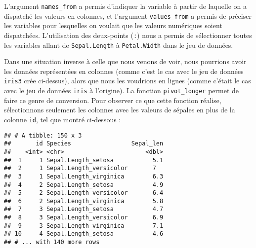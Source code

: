 \documentclass[
  french,
]{book}
\newenvironment{Shaded}{\begin{snugshade}}{\end{snugshade}}
\newcommand{\DataTypeTok}[1]{\textcolor[rgb]{0.13,0.29,0.53}{#1}}
\newcommand{\KeywordTok}[1]{\textcolor[rgb]{0.13,0.29,0.53}{\textbf{#1}}}
\newcommand{\NormalTok}[1]{#1}
\newcommand{\OperatorTok}[1]{\textcolor[rgb]{0.81,0.36,0.00}{\textbf{#1}}}
\newcommand{\StringTok}[1]{\textcolor[rgb]{0.31,0.60,0.02}{#1}}
\begin{document}
L'argument \texttt{names\_from} a permis d'indiquer la variable à partir de laquelle on a dispatché les valeurs en colonnes, et l'argument \texttt{values\_from} a permis de préciser les variables pour lesquelles on voulait que les valeurs numériques soient dispatchées. L'utilisation des deux-points (\texttt{:}) nous a permis de sélectionner toutes les variables allant de \texttt{Sepal.Length} à \texttt{Petal.Width} dans le jeu de données.

Dans une situation inverse à celle que nous venons de voir, nous pourrions avoir les données représentées en colonnes (comme c'est le cas avec le jeu de données \texttt{iris3} crée ci-dessus), alors que nous les voudrions en lignes (comme c'était le cas avec le jeu de données \texttt{iris} à l'origine). La fonction \texttt{pivot\_longer} permet de faire ce genre de conversion. Pour observer ce que cette fonction réalise, sélectionnons seulement les colonnes avec les valeurs de sépales en plus de la colonne \texttt{id}, tel que montré ci-dessous :

\begin{Shaded}
\end{Shaded}

\begin{verbatim}
## # A tibble: 150 x 3
##       id Species                 Sepal_len
##    <int> <chr>                       <dbl>
##  1     1 Sepal.Length_setosa           5.1
##  2     1 Sepal.Length_versicolor       7  
##  3     1 Sepal.Length_virginica        6.3
##  4     2 Sepal.Length_setosa           4.9
##  5     2 Sepal.Length_versicolor       6.4
##  6     2 Sepal.Length_virginica        5.8
##  7     3 Sepal.Length_setosa           4.7
##  8     3 Sepal.Length_versicolor       6.9
##  9     3 Sepal.Length_virginica        7.1
## 10     4 Sepal.Length_setosa           4.6
## # ... with 140 more rows
\end{verbatim}
\end{document}
